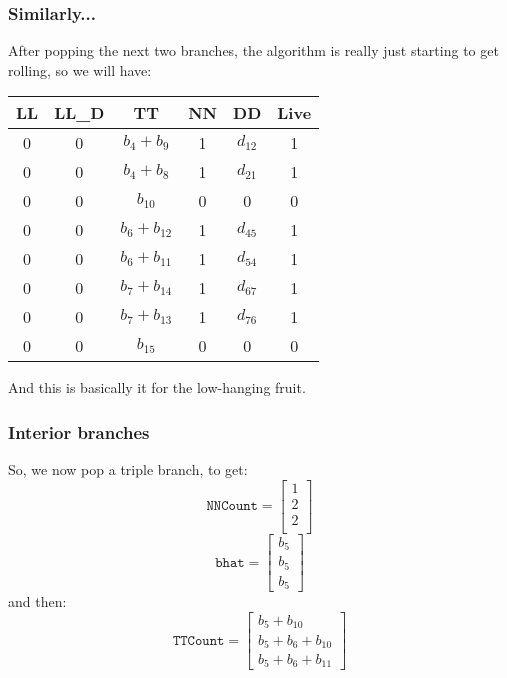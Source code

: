\documentclass[11pt]{article}
\begin{document}
\begin{tiny}
\subsubsection{Similarly...}
After popping the next two branches, the algorithm is really just starting to get rolling, so we will have:
\begin{center}
\begin{tabular}{cccccc}
\hline
LL  & LL\_D  & TT  & NN & DD  & Live \\
\hline
0   & 0     & $b_4+b_9$   & 1  & $d_{12}$   & 1 \\
0   & 0     & $b_4+b_8$   & 1  & $d_{21}$   & 1 \\
0   & 0     & $b_10$   & 0  & 0   & 0 \\
0   & 0     & $b_6 + b_{12}$   & 1  & $d_{45}$   & 1 \\
0   & 0     & $b_6 + b_{11}$   & 1  & $d_{54}$   & 1 \\
0   & 0     & $b_7+b_{14}$   & 1  & $d_{67}$   & 1 \\
0   & 0     & $b_7+b_{13}$   & 1  & $d_{76}$   & 1 \\
0   & 0     & $b_15$   & 0  & 0   & 0 \\
\hline
\end{tabular}
\end{center}

And this is basically it for the low-hanging fruit. 
\subsubsection{Interior branches} 
So, we now pop a triple branch, to get:
\begin{equation*}
\texttt{NNCount}=\left[\begin{array}{c} 1 \\ 2 \\ 2 \\ \end{array} \right]
\end{equation*}
\begin{equation*}
\texttt{bhat}=\left[\begin{array}{c} b_5 \\ b_5 \\ b_5 \end{array} \right]
\end{equation*}
and then:
\begin{equation*}
\texttt{TTCount}=\left[\begin{array}{c}b_5+b_{10} \\ b_5+ b_6 +b_{10}\\ b_5+b_6+b_{11} \end{array} \right]
\end{equation*}


\end{tiny}
\end{document}
